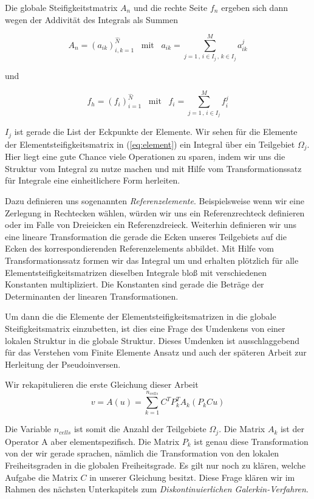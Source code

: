Die globale Steifigkeitstmatrix $A_n$ und die rechte Seite $f_n$ ergeben sich dann wegen der Addivität des Integrals als Summen

\begin{equation*}
A_n = (a_{ik})_{i,k=1}^{\hat{N}} \, \, \, \text{ mit } \, \, \, a_{ik} = \sum_{j=1 \, , \, i \in I_j \, , \, k \in I_j }^M a_{ik}^j 
\end{equation*}

und

\begin{equation*}
f_h = (f_i)_{i=1}^{\hat{N}} \, \, \, \text{ mit } \, \, \, f_i = \sum_{j=1 \, , \, i \in I_j}^M f_i^j
\end{equation*}

$I_j$ ist gerade die List der Eckpunkte der Elemente.
Wir sehen für die Elemente der Elementsteifigkeitsmatrix in (\ref{eq:element}) ein Integral über ein Teilgebiet $\Omega_j$. Hier liegt eine gute Chance viele Operationen zu sparen, indem wir uns die Struktur vom Integral zu nutze machen und mit Hilfe vom Transformationssatz für Integrale eine einheitlichere Form herleiten.

Dazu definieren uns sogenannten \textit{Referenzelemente}. Beispielsweise wenn wir eine Zerlegung in Rechtecken wählen, würden wir uns ein Referenzrechteck definieren oder im Falle von Dreieicken ein Referenzdreieck. Weiterhin definieren wir uns eine lineare Transformation die gerade die Ecken unseres Teilgebiets auf die Ecken des korrespondierenden Referenzelements abbildet. Mit Hilfe vom Transformationssatz formen wir das Integral um und erhalten plötzlich für alle Elementsteifigkeitsmatrizen dieselben Integrale bloß mit verschiedenen Konstanten multipliziert. Die Konstanten sind gerade die Beträge der Determinanten der linearen Transformationen.

Um dann die die Elemente der Elementsteifigkeitsmatrizen in die globale Steifigkeitsmatrix einzubetten, ist dies eine Frage des Umdenkens von einer lokalen Struktur in die globale Struktur.
Dieses Umdenken ist ausschlaggebend für das Verstehen vom Finite Elemente Ansatz und auch der späteren Arbeit zur Herleitung der Pseudoinversen.

Wir rekapitulieren die erste Gleichung dieser Arbeit
\begin{equation} \label{eq:main2}
v=A(u)=\sum_{k=1}^{n_{cells}} C^T P_k^T A_k (P_k Cu)
\end{equation}

Die Variable $n_{cells}$ ist somit die Anzahl der Teilgebiete $\Omega_j$. Die Matrix $A_k$ ist der Operator A aber elementspezifisch. Die Matrix $P_k$ ist genau diese Transformation von der wir gerade sprachen, nämlich die Transformation von den lokalen Freiheitsgraden in die globalen Freiheitsgrade. Es gilt nur noch zu klären, welche Aufgabe die Matrix $C$ in unserer Gleichung besitzt. Diese Frage klären wir im Rahmen des nächsten Unterkapitels zum \textit{Diskontinuierlichen Galerkin-Verfahren}.

